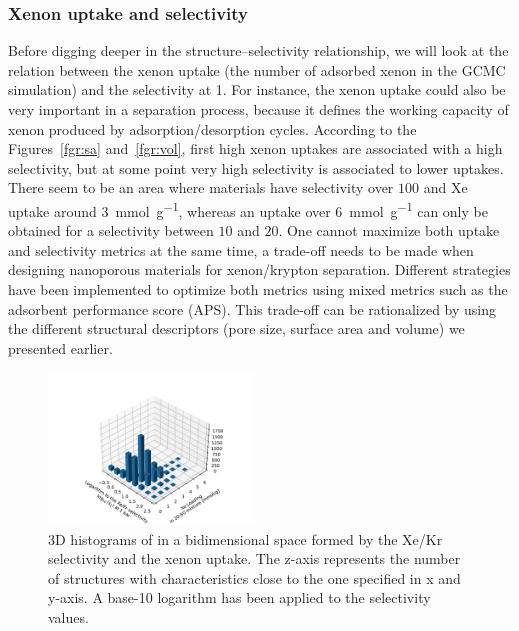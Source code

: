 \documentclass[main.tex]{subfiles}
\begin{document}
\subsubsection{Xenon uptake and selectivity}

Before digging deeper in the structure--selectivity relationship, we will look at the relation between the xenon uptake (the number of adsorbed xenon in the GCMC simulation) and the selectivity at \SI{1}{\atm}. For instance, the xenon uptake could also be very important in a separation process, because it defines the working capacity of xenon produced by adsorption/desorption cycles. According to the Figures~\ref{fgr:sa} and~\ref{fgr:vol}, first high xenon uptakes are associated with a high selectivity, but at some point very high selectivity is associated to lower uptakes. There seem to be an area where materials have selectivity over $100$ and Xe uptake around \SI{3}{\milli\mole\per\gram}, whereas an uptake over \SI{6}{\milli\mole\per\gram} can only be obtained for a selectivity between $10$ and $20$. One cannot maximize both uptake and selectivity metrics at the same time, a trade-off needs to be made when designing nanoporous materials for xenon/krypton separation.\autocite{Zhang_2022} Different strategies have been implemented to optimize both metrics using mixed metrics such as the adsorbent performance score (APS).\autocite{Solanki_2020}
This trade-off can be rationalized by using the different structural descriptors (pore size, surface area and volume) we presented earlier. 

\begin{figure}[h]
  \centering
  \includegraphics[width=0.48\textwidth]{figures/2-thermo/3D_hist_selec_uptake.pdf}
  \caption{3D histograms of in a bidimensional space formed by the Xe/Kr selectivity and the xenon uptake. The z-axis represents the number of structures with characteristics close to the one specified in x and y-axis. A base-10 logarithm has been applied to the selectivity values.}\label{fgr:3D_uptake}
\end{figure}
\end{document}

